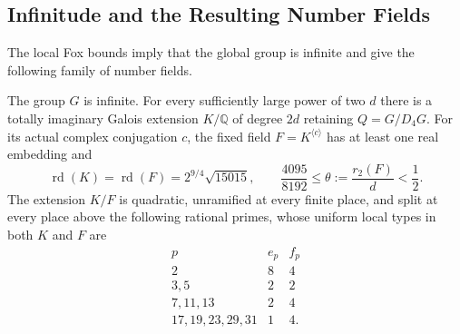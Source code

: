 \subsection{Infinitude and the Resulting Number Fields}
The local Fox bounds imply that the global group is infinite and give
the following family of number fields.
\begin{theorem}\label{tw:new-field-family}\label{tw:field-family}
The group $G$ is infinite. For every sufficiently large power of two $d$
there is a totally imaginary Galois extension $K/\mathbb Q$ of degree
$2d$ retaining $Q=G/D_4G$. For its actual complex conjugation $c$, the
fixed field $F=K^{\langle c\rangle}$ has at least one real embedding and
\[
 \operatorname{rd}(K)=\operatorname{rd}(F)
 =2^{9/4}\sqrt{15015},\qquad
 \frac{4095}{8192}\le\theta:=\frac{r_2(F)}d<\frac12.
\]
The extension $K/F$ is quadratic, unramified at every finite place, and
split at every place above the following rational primes, whose uniform
local types in both $K$ and $F$ are
\[
\begin{array}{c|c|c}
 p&e_p&f_p\\\hline
 2&8&4\\
 3,5&2&2\\
 7,11,13&2&4\\
 17,19,23,29,31&1&4.
\end{array}
\]
\end{theorem}
